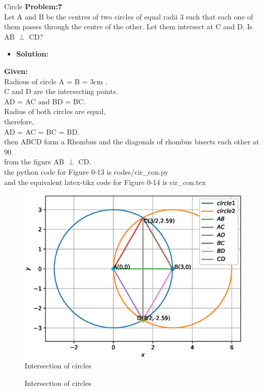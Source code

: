 \begin{frame}{Circle}
{\textbf{Problem:7}\\Let A and B be the centres of two circles of equal radii 3 such that each one of them passes through the centre of the other. Let them intersect at C and D. Is AB $\perp$ CD?}
\begin{itemize}
\item \textbf{Solution:}
\end{itemize}
\textbf{Given:}\\
Radious of circle A = B = 3cm .\\
C and D are the intersecting points.\\
AD = AC and BD = BC.\\
Radius of both circles are equal,\\
 therefore,\\
 AD = AC = BC = BD.\\
then ABCD form a Rhombus and the diagonals of rhombus bisects each other at 90\degree.\\
from the figure  AB $\perp$ CD.\\ 
the python code for  Figure 0-13 is codes/cir\_con.py\\
and the equivalent latex-tikz code for Figure 0-14 is cir\_con.tex
\end{frame}
\begin{frame}{} 
\begin{figure}[!ht]
	\begin{center}
\includegraphics[width=0.8\columnwidth]{./figs/circle_con.eps}
	\end{center}
	\caption{Intersection of circles}
	\label{}	
\end{figure}
\end{frame}
\begin{frame}
\begin{figure}[!ht]
	\begin{center}
		\resizebox{0.8\columnwidth}{!}{}
	\end{center}
	\caption{Intersection of circles}
	\label{}	
\end{figure}
\end{frame}
